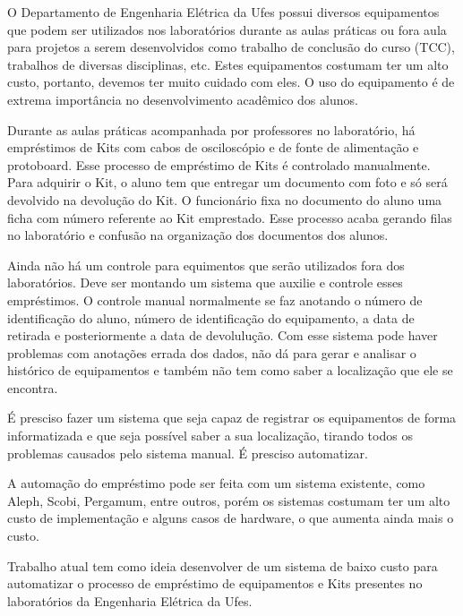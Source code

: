\vspace{-42pt}

O Departamento de Engenharia Elétrica da Ufes possui diversos equipamentos que podem ser utilizados nos laboratórios durante as aulas práticas ou fora aula  para projetos a serem desenvolvidos como trabalho de conclusão do curso (TCC), trabalhos de diversas disciplinas, etc. Estes equipamentos costumam ter um alto custo, portanto, devemos ter muito cuidado com eles. O uso do equipamento é de extrema importância no desenvolvimento acadêmico dos alunos.
	

Durante as aulas práticas acompanhada por professores no laboratório, há empréstimos de Kits com cabos de osciloscópio e de fonte de alimentação e protoboard. Esse processo de empréstimo de Kits é controlado manualmente. Para adquirir o Kit, o aluno tem que entregar um documento com foto e só será devolvido na devolução do Kit. O funcionário fixa no documento do aluno uma ficha com número referente ao Kit emprestado. Esse processo acaba gerando filas no laboratório e confusão na organização dos documentos dos alunos. 

Ainda não há um controle para equimentos que serão utilizados fora dos laboratórios. Deve ser montando um sistema que auxilie e controle esses empréstimos.  O controle manual normalmente se faz anotando o número de identificação do aluno, número de identificação do equipamento, a data de retirada e posteriormente a data de devolulução. Com esse sistema pode haver problemas com anotações errada dos dados, não dá para gerar e analisar o histórico de equipamentos e também não tem como saber a localização que ele se encontra. 

É presciso fazer um sistema que seja capaz de registrar os equipamentos de forma informatizada e que seja possível saber a sua localização, tirando todos os problemas causados pelo sistema manual. É presciso automatizar.

A automação do empréstimo pode ser feita com um sistema existente, como Aleph, Scobi, Pergamum, entre outros, porém os sistemas costumam ter um alto custo de implementação e alguns casos de hardware, o que aumenta ainda mais o custo.

Trabalho atual tem como ideia  desenvolver de um sistema de baixo custo para automatizar o processo de empréstimo de equipamentos e  Kits presentes no laboratórios da Engenharia Elétrica da Ufes.









